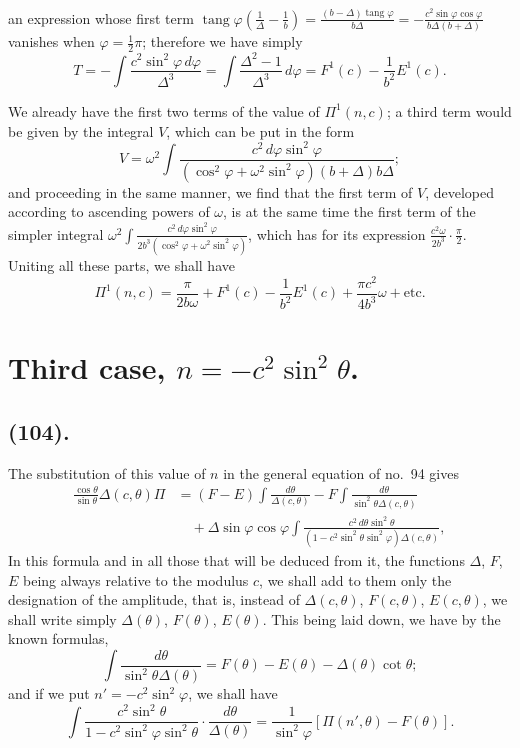 \documentclass{article}
\begin{document}
an expression whose first term $\operatorname{tang}\varphi\left(\frac{1}{\Delta}-\frac{1}{b}\right)=\frac{(b-\Delta)\operatorname{tang}\varphi}{b\Delta}=-\frac{c^{2}\sin\varphi\cos\varphi}{b\Delta(b+\Delta)}$ vanishes when $\varphi=\frac{1}{2}\pi$; therefore we have simply
\[ T=-\int\frac{c^{2}\sin^{2}\varphi\,d\varphi}{\Delta^{3}}=\int\frac{\Delta^{2}-1}{\Delta^{3}}\,d\varphi=F^{1}(c)-\frac{1}{b^{2}}E^{1}(c). \]

We already have the first two terms of the value of $\Pi^{1}(n,c)$; a third term would be given by the integral $V$, which can be put in the form
\[ V=\omega^{2}\int\frac{c^{2}\,d\varphi\sin^{2}\varphi}{(\cos^{2}\varphi+\omega^{2}\sin^{2}\varphi)(b+\Delta)b\Delta}; \]
and proceeding in the same manner, we find that the first term of $V$, developed according to ascending powers of $\omega$, is at the same time the first term of the simpler integral $\omega^{2}\displaystyle\int\frac{c^{2}\,d\varphi\sin^{2}\varphi}{2b^{3}(\cos^{2}\varphi+\omega^{2}\sin^{2}\varphi)}$, which has for its expression $\frac{c^{2}\omega}{2b^{3}}\cdot\frac{\pi}{2}$. Uniting all these parts, we shall have
\[ \Pi^{1}(n,c)=\frac{\pi}{2b\omega}+F^{1}(c)-\frac{1}{b^{2}}E^{1}(c)+\frac{\pi c^{2}}{4b^{3}}\omega+\text{etc.} \]

\section*{Third case, $n=-c^{2}\sin^{2}\theta$.}

\subsection*{(104).}

The substitution of this value of $n$ in the general equation of no.\ 94 gives
\[ \begin{aligned} \frac{\cos\theta}{\sin\theta}\Delta(c,\theta)\Pi&=(F-E)\int\frac{d\theta}{\Delta(c,\theta)}-F\int\frac{d\theta}{\sin^{2}\theta\Delta(c,\theta)}\\ &\quad+\Delta\sin\varphi\cos\varphi\int\frac{c^{2}\,d\theta\sin^{2}\theta}{(1-c^{2}\sin^{2}\theta\sin^{2}\varphi)\Delta(c,\theta)}, \end{aligned} \]
In this formula and in all those that will be deduced from it, the functions $\Delta$, $F$, $E$ being always relative to the modulus $c$, we shall add to them only the designation of the amplitude, that is, instead of $\Delta(c,\theta)$, $F(c,\theta)$, $E(c,\theta)$, we shall write simply $\Delta(\theta)$, $F(\theta)$, $E(\theta)$. This being laid down, we have by the known formulas,
\[ \int\frac{d\theta}{\sin^{2}\theta\Delta(\theta)}=F(\theta)-E(\theta)-\Delta(\theta)\cot\theta; \]
and if we put $n'=-c^{2}\sin^{2}\varphi$, we shall have
\[ \int\frac{c^{2}\sin^{2}\theta}{1-c^{2}\sin^{2}\varphi\sin^{2}\theta}\cdot\frac{d\theta}{\Delta(\theta)}=\frac{1}{\sin^{2}\varphi}[\Pi(n',\theta)-F(\theta)]. \]
\end{document}
